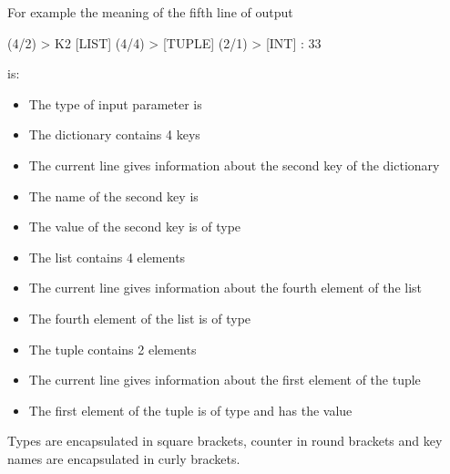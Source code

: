 For example the meaning of the fifth line of output

\begin{pythonlog}
[DICT] (4/2) > {K2} [LIST] (4/4) > [TUPLE] (2/1) > [INT]  :  33
\end{pythonlog}

is:

\begin{itemize}
   \item The type of input parameter  is 
   \item The dictionary contains 4 keys
   \item The current line gives information about the second key of the dictionary
   \item The name of the second key is 
   \item The value of the second key is of type 
   \item The list contains 4 elements
   \item The current line gives information about the fourth element of the list
   \item The fourth element of the list is of type 
   \item The tuple contains 2 elements
   \item The current line gives information about the first element of the tuple
   \item The first element of the tuple is of type  and has the value 
\end{itemize}

Types are encapsulated in square brackets, counter in round brackets and key names are encapsulated in curly brackets.

